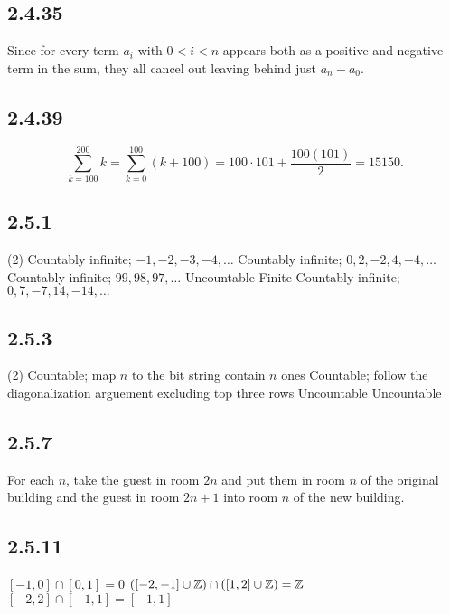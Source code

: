 \documentclass[12pt,titlepage]{extarticle}
\begin{document}
\subsection*{2.4.35}
Since for every term $a_i$ with $0 < i < n$ appears both as a positive and negative term in the sum, they all cancel out leaving behind just $a_n - a_0$.

\subsection*{2.4.39}
\[
    \sum_{k=100}^{200} k = \sum_{k=0}^{100} (k+100) = 100 \cdot 101 + \frac{100(101)}{2} = 15150
.\]

\subsection*{2.5.1}
\begin{tasks}(2)
    \task Countably infinite; $−1, −2, −3, −4, \ldots$
    \task Countably infinite; $0, 2, -2, 4, -4,\ldots$
    \task Countably infinite; $99, 98, 97, \ldots$
    \task Uncountable 
    \task Finite 
    \task Countably infinite; $0, 7, −7, 14, −14, \ldots$
\end{tasks}

\subsection*{2.5.3}
\begin{tasks}(2)
    \task Countable; map $n$ to the bit string contain $n$ ones
    \task Countable; follow the diagonalization arguement excluding top three rows
    \task Uncountable 
    \task Uncountable
\end{tasks}

\subsection*{2.5.7}
For each $n$, take the guest in room $2n$ and put them in room $n$ of the original building and the guest in room $2n + 1$ into room $n$ of the new building.

\subsection*{2.5.11}
\begin{tasks}
    \task $[-1,0] \cap [0,1] = \qty{0}$
    \task $([-2,-1] \cup \mathbb{Z}) \cap ([1,2] \cup \mathbb{Z}) = \mathbb{Z}$
    \task $[-2, 2] \cap [-1, 1] = [-1, 1]$
\end{tasks}
\end{document}
